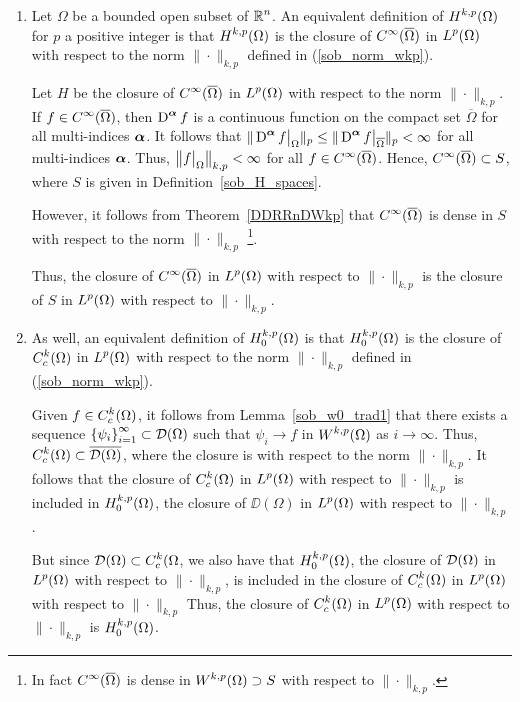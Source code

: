 \begin{rmkList} \label{sob_compl_Hk2}
\begin{enumerate}
\item Let $\Omega$ be a bounded open subset of $\displaystyle \mathbb{R}^n$.
An equivalent definition of $\displaystyle H^{k,p}(\Omega)$ for $p$ a
positive integer is that $\displaystyle H^{k,p}(\Omega)$ is the closure of
$\displaystyle C^\infty(\overline{\Omega})$ in $\displaystyle L^p(\Omega)$
with respect to the norm $\|\cdot\|_{k,p}$ defined in
(\ref{sob_norm_wkp}).

Let $H$ be the closure of $\displaystyle C^\infty(\overline{\Omega})$ in
$\displaystyle L^p(\Omega)$ with respect to the norm $\|\cdot\|_{k,p}$.
If $\displaystyle f\in C^\infty(\overline{\Omega})$, then
$\displaystyle \operatorname{D}^{{\bm{\alpha}}} f$ is a
continuous function on the compact set $\overline{\Omega}$ for all
multi-indices ${\bm{\alpha}}$.  It follows that
$\displaystyle \|\operatorname{D}^{{\bm{\alpha}}} f\big|_{\Omega}\|_p \leq
\|\operatorname{D}^{{\bm{\alpha}}} f\big|_{\overline{\Omega}}\|_p < \infty$ for all
multi-indices ${\bm{\alpha}}$.  Thus,
$\displaystyle \left\|f\big|_{\Omega} \right\|_{k,p} < \infty$ for all
$\displaystyle f\in C^\infty(\overline{\Omega})$.  Hence,
$\displaystyle C^\infty(\overline{\Omega}) \subset S$, where $S$ is given in
Definition~\ref{sob_H_spaces}.

However, it follows from Theorem~\ref{DDRRnDWkp} that
$\displaystyle C^\infty(\overline{\Omega})$ is dense in $S$ with
respect to the norm $\|\cdot\|_{k,p}$ \footnote{In fact
$\displaystyle C^\infty(\overline{\Omega})$
is dense in $\displaystyle W^{k,p}(\Omega) \supset S$ with respect to
$\|\cdot\|_{k,p}$.}.

Thus, the closure of $\displaystyle C^\infty(\overline{\Omega})$ in
$\displaystyle L^p(\Omega)$ with respect to $\|\cdot\|_{k,p}$
is the closure of $S$ in $\displaystyle L^p(\Omega)$
with respect to $\|\cdot\|_{k,p}$.

\item As well, an equivalent definition of
$\displaystyle H^{k,p}_0(\Omega)$ is that
$\displaystyle H^{k,p}_0(\Omega)$ is the
closure of $\displaystyle C^k_c(\Omega)$ in $\displaystyle L^p(\Omega)$
with respect to the norm $\|\cdot\|_{k,p}$ defined in
(\ref{sob_norm_wkp}).

Given $\displaystyle f \in C^k_c(\Omega)$, it follows from
Lemma~\ref{sob_w0_trad1} that there exists a sequence
$\displaystyle \left\{ \psi_i \right\}_{i=1}^\infty \subset \mathcal{D}(\Omega)$
such that $\psi_i \to f$ in $\displaystyle W^{k,p}(\Omega)$ as $i \to \infty$.
Thus, $\displaystyle C^k_c(\Omega) \subset \overline{\mathcal{D}(\Omega)}$,
where the closure is with respect to the norm $\|\cdot\|_{k,p}$.
It follows that the closure of $\displaystyle C^k_c(\Omega)$ in
$\displaystyle L^p(\Omega)$ with respect to $\|\cdot\|_{k,p}$
is included in $\displaystyle H^{k,p}_0(\Omega)$, the closure of
$\DD(\Omega)$ in $\displaystyle L^p(\Omega)$
with respect to $\|\cdot\|_{k,p}$.

But since $\displaystyle \mathcal{D}(\Omega) \subset C^k_c(\Omega$, we also have that
$\displaystyle H^{k,p}_0(\Omega)$, the closure of
$\displaystyle \mathcal{D}(\Omega)$ in $\displaystyle L^p(\Omega)$ with
respect to $\|\cdot\|_{k,p}$, is included in the closure of
$\displaystyle C^k_c(\Omega)$ in
$\displaystyle L^p(\Omega)$ with respect to $\|\cdot\|_{k,p}$ 
Thus, the closure of $\displaystyle C^k_c(\Omega)$ in
$\displaystyle L^p(\Omega)$ with respect to $\|\cdot\|_{k,p}$
is $\displaystyle H^{k,p}_0(\Omega)$.
\end{enumerate}
\end{rmkList}

